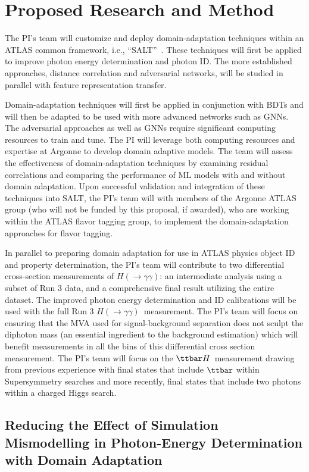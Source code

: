 \documentclass[letter, USenglish, 11pt, subfigure]{article}
\newcommand{\tth}{\ensuremath{\ttbar H}}
\newcommand{\hyy}{\ensuremath{H(\to\gamma\gamma)}}
\begin{document}
\clearpage

\section{Proposed Research and Method}

The PI's team will customize and deploy domain-adaptation techniques within an ATLAS common framework, i.e., ``SALT''~\cite{salt}. These techniques will first be applied to improve photon energy determination and photon ID. The more established approaches, distance correlation and adversarial networks, will be studied in parallel with feature representation transfer. 

Domain-adaptation techniques will first be applied in conjunction with BDTs and will then be adapted to be used with more advanced networks such as GNNs. The adversarial approaches as well as GNNs require significant computing resources to train and tune. The PI will leverage both computing resources and expertise at Argonne to develop domain adaptive models.
The team will assess the effectiveness of domain-adaptation techniques by examining residual correlations and comparing the performance of ML models with and without domain adaptation. Upon successful validation and integration of these techniques into SALT, the PI's team will with members of the Argonne ATLAS group (who will not be funded by this proposal, if awarded), who are working within the ATLAS flavor tagging group, to implement the domain-adaptation approaches for flavor tagging.

In parallel to preparing domain adaptation for use in ATLAS physics object ID and property determination, the PI's team will contribute to two differential cross-section measurements of \hyy: an intermediate analysis using a subset of Run 3 data, and a comprehensive final result utilizing the entire dataset. The improved photon energy determination and ID calibrations will be used with the full Run 3 \hyy\  measurement. The PI's team will focus on ensuring that the MVA used for signal-background separation does not sculpt the diphoton mass (an essential ingredient to the background estimation) which will benefit measurements in all the bins of this diifferential cross section measurement. The PI's team will focus on the \tth\ measurement drawing from previous experience with final states that include $\ttbar$ within Supersymmetry searches and more recently, final states that include two photons within a charged Higgs search. 

\subsection{Reducing the Effect of Simulation Mismodelling in Photon-Energy Determination with Domain Adaptation}
\end{document}
